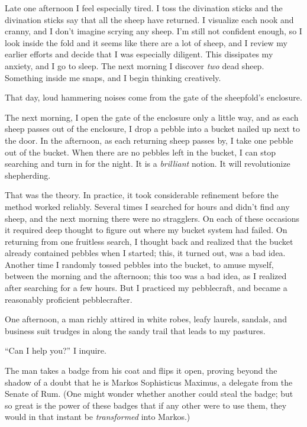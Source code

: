 {
 Late one afternoon I feel especially tired. I toss the divination
sticks and the divination sticks say that all the sheep have returned.
I visualize each nook and cranny, and I don't imagine
scrying any sheep. I'm still not confident enough, so I
look inside the fold and it seems like there are a lot of sheep, and I
review my earlier efforts and decide that I was especially diligent.
This dissipates my anxiety, and I go to sleep. The next morning I
discover \textit{two} dead sheep. Something inside me snaps, and I
begin thinking creatively.}

{
 That day, loud hammering noises come from the gate of the
sheepfold's enclosure.}

{
 The next morning, I open the gate of the enclosure only a little
way, and as each sheep passes out of the enclosure, I drop a pebble
into a bucket nailed up next to the door. In the afternoon, as each
returning sheep passes by, I take one pebble out of the bucket. When
there are no pebbles left in the bucket, I can stop searching and turn
in for the night. It is a \textit{brilliant} notion. It will
revolutionize shepherding.}

{
 That was the theory. In practice, it took considerable refinement
before the method worked reliably. Several times I searched for hours
and didn't find any sheep, and the next morning there
were no stragglers. On each of these occasions it required deep thought
to figure out where my bucket system had failed. On returning from one
fruitless search, I thought back and realized that the bucket already
contained pebbles when I started; this, it turned out, was a bad idea.
Another time I randomly tossed pebbles into the bucket, to amuse
myself, between the morning and the afternoon; this too was a bad idea,
as I realized after searching for a few hours. But I practiced my
pebblecraft, and became a reasonably proficient pebblecrafter.}

{
 One afternoon, a man richly attired in white robes, leafy laurels,
sandals, and business suit trudges in along the sandy trail that leads
to my pastures.}

{
 ``Can I help you?'' I inquire.}

{
 The man takes a badge from his coat and flips it open, proving
beyond the shadow of a doubt that he is Markos Sophisticus Maximus, a
delegate from the Senate of Rum. (One might wonder whether another
could steal the badge; but so great is the power of these badges that
if any other were to use them, they would in that instant be
\textit{transformed} into Markos.)}


